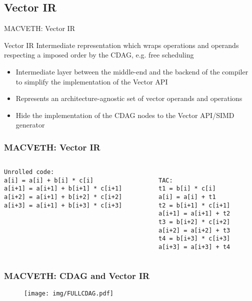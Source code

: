 \documentclass[xcolor=table,hideothersubsections,aspectratio=1610]{beamer}
\begin{document}
\subsection{Vector IR}
\begin{frame}{MACVETH: Vector IR}
    \begin{block}{Vector IR}
        Intermediate representation which wraps operations and operands respecting a imposed order by the CDAG, e.g. free scheduling
    \end{block}

    \begin{itemize}
        \item Intermediate layer between the middle-end and the backend of the compiler to simplify the implementation of the Vector API
        \item Represents an architecture-agnostic set of vector operands and operations
        \item Hide the implementation of the CDAG nodes to the Vector API/SIMD generator
    \end{itemize}

\end{frame}

\begin{frame}[fragile]
    \frametitle{MACVETH: Vector IR}
    \begin{columns}
        \begin{column}{0.5\textwidth}
            \begin{verbatim}
Unrolled code:
a[i] = a[i] + b[i] * c[i]
a[i+1] = a[i+1] + b[i+1] * c[i+1]
a[i+2] = a[i+1] + b[i+2] * c[i+2]
a[i+3] = a[i+1] + b[i+3] * c[i+3]
\end{verbatim}
        \end{column}
        \begin{column}{0.35\textwidth}  %
            \begin{verbatim}

TAC: 
t1 = b[i] * c[i]
a[i] = a[i] + t1
t2 = b[i+1] * c[i+1]
a[i+1] = a[i+1] + t2
t3 = b[i+2] * c[i+2]
a[i+2] = a[i+2] + t3
t4 = b[i+3] * c[i+3]
a[i+3] = a[i+3] + t4
\end{verbatim}

        \end{column}
    \end{columns}
\end{frame}

\begin{frame}[fragile]
    \frametitle{MACVETH: CDAG and Vector IR}
    \begin{figure}
        \centering
        \texttt{[image: img/FULLCDAG.pdf]}
    \end{figure}
\end{frame}
\end{document}

